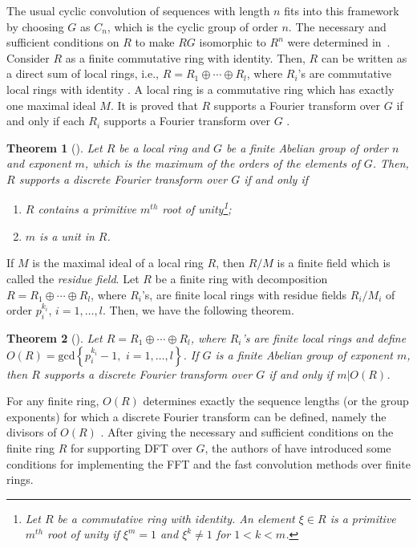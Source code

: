 \documentclass[journal,draftclsnofoot,onecolumn,12pt,twoside]{IEEEtran}
\newtheorem{theorem}{Theorem}
\begin{document}
The usual cyclic convolution of sequences with length $n$ fits into this framework by choosing $G$ as $C_n$, which is the cyclic group of
order $n$.  The necessary and sufficient conditions on $R$ to make $RG$ isomorphic to $R^n$ were determined in~\cite{group_ring_FFT}. Consider $R$ as a finite commutative ring with identity. Then, $R$ can be written as a direct sum of local rings, i.e., $R=R_1\oplus\cdots  \oplus R_l$, where $R_i$'s are commutative local rings with identity \cite[Theorem VI.2]{macdonald}. A local ring is a commutative ring which has exactly one maximal ideal $M$.
It is proved  that $R$ supports a Fourier transform over $G$ if and only if each
$R_i$ supports a Fourier transform over $G$ \cite[Theorem 1]{group_ring_FFT}.
\begin{theorem}[\emph{\cite[Theorem 2]{group_ring_FFT}}]\label{FFT1}
Let $R$ be a local ring and $G$ be a finite Abelian group of order $n$ and exponent $m$, which is the maximum of the orders of the elements of $G$. Then, $R$ supports a discrete Fourier transform over $G$ if and only if
\begin{enumerate}
  \item $R$ contains a primitive $m^{th}$ root of unity\footnote{Let $R$ be a commutative ring with identity. An element $\xi\in R$ is a primitive $m^{th}$ root of unity if $\xi^m = 1$ and $\xi^k\neq 1$ for $1 < k < m$.};
  \item $m$ is a unit in $R$.
\end{enumerate}
\end{theorem}

If $M$ is the maximal ideal of a local ring $R$, then $R/M$ is a finite field which is called the \emph{residue field}. Let $R$ be a finite ring with decomposition $R = R_1\oplus \cdots \oplus R_l$, where $R_i$'s, are finite local rings with residue
fields $R_i/M_i$ of order $p_i^{k_i}$, $i=1,\ldots,l$. Then, we have the following theorem.
\begin{theorem}[\emph{\cite[Theorem 4]{group_ring_FFT}}]\label{FFT2}
Let $R = R_1\oplus \cdots \oplus R_l$, where $R_i$'s are finite local rings and define $O(R)=\mathrm{gcd}\left\{p_i^{k_i}-1,\,\,i=1,\ldots,l\right\}$. If $G$ is a finite Abelian group of exponent $m$, then $R$ supports a discrete Fourier transform over $G$ if and only if $m|O(R)$.
\end{theorem}



For any finite ring, $O(R)$  determines exactly the sequence lengths (or the group exponents) for which a
discrete Fourier transform can be defined, namely the divisors of $O(R)$ \cite{group_ring_FFT}. After giving the necessary and sufficient conditions on the finite ring $R$ for supporting DFT over $G$, the authors of \cite{group_ring_FFT} have introduced some conditions for implementing the FFT and the fast convolution methods over finite rings.
\end{document}
